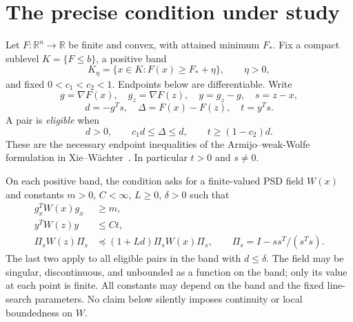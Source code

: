 \begingroup
\providecommand{\R}{}
\renewcommand{\R}{\mathbb R}
\providecommand{\PSD}{}
\renewcommand{\PSD}{\succeq0}
\providecommand{\range}{}
\renewcommand{\range}{\operatorname{range}}
\providecommand{\aff}{}
\renewcommand{\aff}{\operatorname{aff}}
\providecommand{\conv}{}
\renewcommand{\conv}{\operatorname{conv}}
\providecommand{\norm}{}
\renewcommand{\norm}[1]{\left\|#1\right\|}
\providecommand{\ip}{}
\renewcommand{\ip}[2]{\langle #1,#2\rangle}
\makeatletter\let\c@lemma\c@theorem\let\c@corollary\c@theorem\let\c@proposition\c@theorem\let\c@remark\c@theorem\makeatother
\renewcommand{\thelemma}{\thetheorem}\renewcommand{\thecorollary}{\thetheorem}\renewcommand{\theproposition}{\thetheorem}\renewcommand{\theremark}{\thetheorem}
\renewcommand{\thetheorem}{G.\arabic{section}.\arabic{theorem}}
\setcounter{section}{0}
\setcounter{theorem}{0}
\setcounter{equation}{0}
\section{The precise condition under study}
Let $F:\R^n\to\R$ be finite and convex, with attained minimum $F_*$. Fix a compact sublevel $K=\{F\le b\}$, a positive band
\[
 K_\eta=\{x\in K:F(x)\ge F_*+\eta\},\qquad \eta>0,
\]
and fixed $0<c_1<c_2<1$. Endpoints below are differentiable. Write
\[
 g=\nabla F(x),\quad g_z=\nabla F(z),\quad y=g_z-g,\quad s=z-x,
\]
\[
 d=-g^Ts,\quad \Delta=F(x)-F(z),\quad t=y^Ts.
\]
A pair is \emph{eligible} when
\begin{equation}
 d>0,\qquad c_1d\le\Delta\le d,\qquad t\ge(1-c_2)d. \tag{G.E}
\end{equation}
These are the necessary endpoint inequalities of the Armijo--weak-Wolfe formulation in Xie--W\"achter~\cite{XW}. In particular $t>0$ and $s\ne0$.

On each positive band, the condition asks for a finite-valued PSD field $W(x)$ and constants $m>0$, $C<\infty$, $L\ge0$, $\delta>0$ such that
\begin{align}
 g_x^TW(x)g_x&\ge m, \tag{G.V}\\
 y^TW(z)y&\le Ct, \tag{G.S}\\
 \Pi_sW(z)\Pi_s&\preceq(1+Ld)\Pi_sW(x)\Pi_s,
 \qquad \Pi_s=I-ss^T/(s^Ts). \tag{G.T}
\end{align}
The last two apply to all eligible pairs in the band with $d\le\delta$. The field may be singular, discontinuous, and unbounded as a function on the band; only its value at each point is finite. All constants may depend on the band and the fixed line-search parameters. No claim below silently imposes continuity or local boundedness on $W$.

